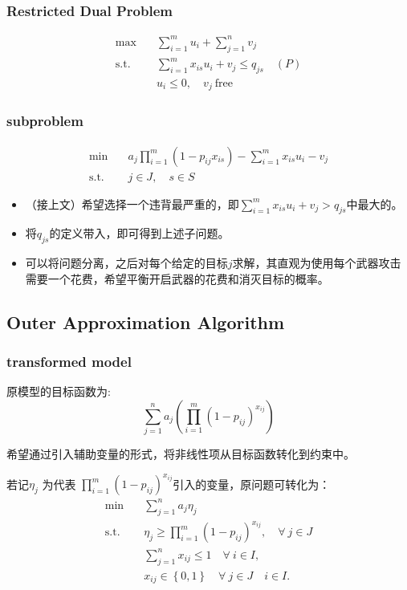 \documentclass[10pt]{beamer}
\newcommand{\sumFromTo}[3]{\ensuremath{\sum_{#1}^{#2} #3}}
\newcommand{\optimalProblem}[3]
{\begin{align*}
    #1 \quad &#2 \\
    \mathrm{s. t.}\quad&#3
\end{align*}}
\begin{document}
\begin{frame}
    \frametitle{Restricted Dual Problem}
    \optimalProblem{\max}{\sumFromTo{i=1}{m}{u_i} + \sumFromTo{j=1}{n}{v_j}}{\sumFromTo{i=1}{m}{x_{is}u_i}+ v_j \leq q_{js}\quad (P) \\ &u_i \leq 0,\quad v_j\ \mathrm{free}}
\end{frame}

\begin{frame}
    \frametitle{subproblem}
    \optimalProblem{\min}{a_j \prod_{i=1}^{m}{(1-p_{ij}x_{is})} -\sumFromTo{i=1}{m}{x_{is}}u_i - v_j}{j \in J,\quad s \in S}
    \begin{itemize}
        \item （接上文）希望选择一个违背最严重的，即$\sumFromTo{i=1}{m}{x_{is}u_i}+ v_j > q_{js}$中最大的。
        \item 将$q_{js}$的定义带入，即可得到上述子问题。
        \item 可以将问题分离，之后对每个给定的目标$j$求解，其直观为使用每个武器攻击需要一个花费，希望平衡开启武器的花费和消灭目标的概率。
    \end{itemize}
\end{frame}




\subsection{Outer Approximation Algorithm}
\begin{frame}
    \frametitle{transformed model}
    原模型的目标函数为:
    \begin{equation*}
        \sum_{j=1}^n a_j \left( \prod_{i=1}^m (1 -  p_{ij})^{x_{ij}} \right)
    \end{equation*}
    {\footnotesize
    希望通过引入辅助变量的形式，将非线性项从目标函数转化到约束中。
    
    若记$\eta_j$ 为代表 $\prod_{i=1}^m (1 -  p_{ij})^{x_{ij}}$引入的变量，原问题可转化为：
    \begin{align}
        \min\quad & \sum_{j=1}^n a_j \eta_j \\ 
        \mathrm{s. t.}\quad & \eta_j \geq \prod_{i=1}^m (1 -  p_{ij})^{x_{ij}}, \quad \forall ~ j \in J \\ 
        &\sum_{j=1}^n x_{ij} \leq 1\quad \forall ~ i \in I,\\
        & x_{ij} \in \left\{ 0,1 \right\} \quad \forall ~ j\in J\quad i \in I.
    \end{align}
    }
\end{frame}
\end{document}
